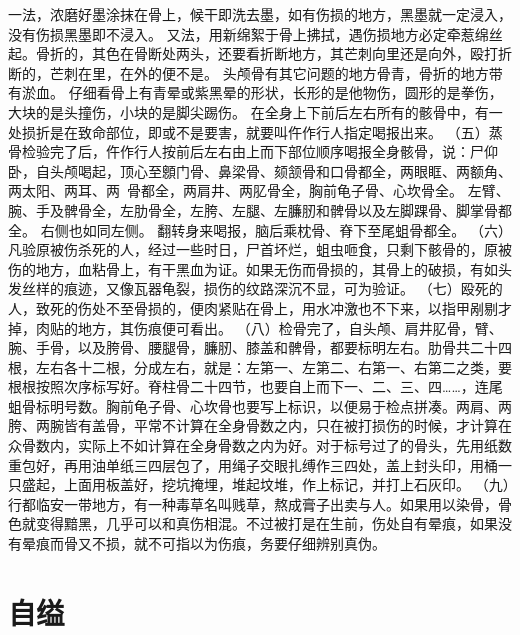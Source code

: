 \documentclass[12pt,UTF8]{ctexbook}
\begin{document}
一法，浓磨好墨涂抹在骨上，候干即洗去墨，如有伤损的地方，黑墨就一定浸入，没有伤损黑墨即不浸入。
又法，用新绵絮于骨上拂拭，遇伤损地方必定牵惹绵丝起。骨折的，其色在骨断处两头，还要看折断地方，其芒刺向里还是向外，殴打折断的，芒刺在里，在外的便不是。
头颅骨有其它问题的地方骨青，骨折的地方带有淤血。
仔细看骨上有青晕或紫黑晕的形状，长形的是他物伤，圆形的是拳伤，大块的是头撞伤，小块的是脚尖踢伤。
在全身上下前后左右所有的骸骨中，有一处损折是在致命部位，即或不是要害，就要叫仵作行人指定喝报出来。
（五）蒸骨检验完了后，仵作行人按前后左右由上而下部位顺序喝报全身骸骨，说：尸仰卧，自头颅喝起，顶心至顖门骨、鼻梁骨、颏颔骨和口骨都全，两眼眶、两额角、两太阳、两耳、两~骨都全，两肩井、两肊骨全，胸前龟子骨、心坎骨全。
左臂、腕、手及髀骨全，左肋骨全，左胯、左腿、左臁肕和髀骨以及左脚踝骨、脚掌骨都全。
右侧也如同左侧。
翻转身来喝报，脑后乘枕骨、脊下至尾蛆骨都全。
（六）凡验原被伤杀死的人，经过一些时日，尸首坏烂，蛆虫咂食，只剩下骸骨的，原被伤的地方，血粘骨上，有干黑血为证。如果无伤而骨损的，其骨上的破损，有如头发丝样的痕迹，又像瓦器龟裂，损伤的纹路深沉不显，可为验证。
（七）殴死的人，致死的伤处不至骨损的，便肉紧贴在骨上，用水冲激也不下来，以指甲剐剔才掉，肉贴的地方，其伤痕便可看出。
（八）检骨完了，自头颅、肩井肊骨，臂、腕、手骨，以及胯骨、腰腿骨，臁肕、膝盖和髀骨，都要标明左右。肋骨共二十四根，左右各十二根，分成左右，就是：左第一、左第二、右第一、右第二之类，要根根按照次序标写好。脊柱骨二十四节，也要自上而下一、二、三、四……，连尾蛆骨标明号数。胸前龟子骨、心坎骨也要写上标识，以便易于检点拼凑。两肩、两胯、两腕皆有盖骨，平常不计算在全身骨数之内，只在被打损伤的时候，才计算在众骨数内，实际上不如计算在全身骨数之内为好。对于标号过了的骨头，先用纸数重包好，再用油单纸三四层包了，用绳子交眼扎缚作三四处，盖上封头印，用桶一只盛起，上面用板盖好，挖坑掩埋，堆起坟堆，作上标记，并打上石灰印。
（九）行都临安一带地方，有一种毒草名叫贱草，熬成膏子出卖与人。如果用以染骨，骨色就变得黯黑，几乎可以和真伤相混。不过被打是在生前，伤处自有晕痕，如果没有晕痕而骨又不损，就不可指以为伤痕，务要仔细辨别真伪。


\chapter{自缢}
\end{document}
